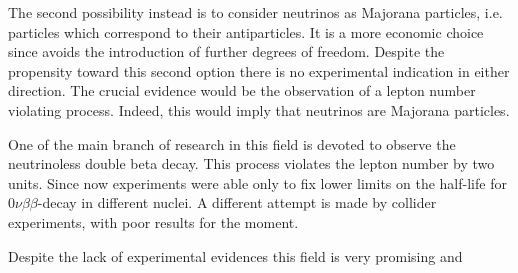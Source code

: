 \documentclass{subnucbo}
\begin{document}
The second possibility instead is to consider neutrinos as Majorana particles, i.e. particles which correspond to their antiparticles. It is a more economic choice since avoids the introduction of further degrees of freedom.
Despite the propensity toward this second option there is no experimental indication in either direction. The crucial evidence would be the observation of a lepton number violating process. Indeed, this would imply that neutrinos are Majorana particles.

One of the main branch of research in this field is devoted to observe the neutrinoless double beta decay. This process violates the lepton number by two units. Since now experiments were able only to fix lower limits on the half-life for $0\nu\beta\beta$-decay in different nuclei.
A different attempt is made by collider experiments, with poor results for the moment.

Despite the lack of experimental evidences this field is very promising and 
\end{document}
